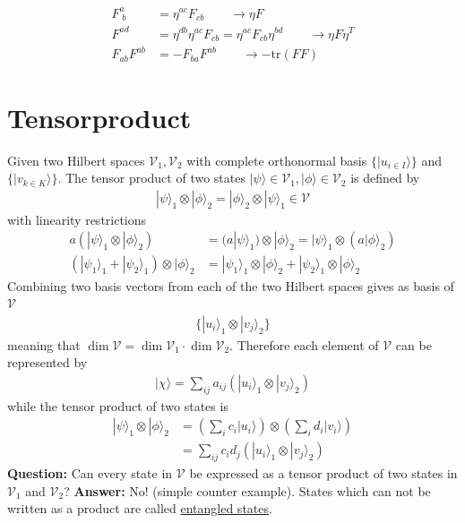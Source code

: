 \documentclass[10pt,a4paper]{book}
\theoremstyle{definition}
\begin{document}
\begin{align}
F^a_{\;b}&=\eta^{ac}F_{cb}\qquad\rightarrow \eta F\\
F^{ad}&=\eta^{db}\eta^{ac}F_{cb}=\eta^{ac}F_{cb}\eta^{bd}\qquad\rightarrow \eta F\eta^T\\
F_{ab}F^{ab}&=-F_{ba}F^{ab}\qquad\rightarrow-\text{tr}(F F)
\end{align}


\section{Tensorproduct}
Given two Hilbert spaces $\mathcal{V}_1, \mathcal{V}_2$ with complete orthonormal basis $\{|u_{i\in I}\rangle\}$ and $\{|v_{k\in K}\rangle\}$. The tensor product of two states $|\psi\rangle\in\mathcal{V}_1, |\phi\rangle\in\mathcal{V}_2$
is defined by
\begin{align}
|\psi\rangle_1 \otimes |\phi\rangle_2= |\phi\rangle_2 \otimes |\psi\rangle_1\in \mathcal{V}
\end{align}
with linearity restrictions
\begin{align}
a(|\psi\rangle_1 \otimes |\phi\rangle_2)
&=(a|\psi\rangle_1) \otimes |\phi\rangle_2
=|\psi\rangle_1 \otimes (a|\phi\rangle_2)\\
(|\psi_1\rangle_1 + |\psi_2\rangle_1)\otimes|\phi\rangle_2
&=|\psi_1\rangle_1\otimes|\phi\rangle_2 + |\psi_2\rangle_1\otimes|\phi\rangle_2
\end{align}
Combining two basis vectors from each of the two Hilbert spaces gives as basis of $\mathcal{V}$
\begin{align}
\{|u_i\rangle_1\otimes|v_j\rangle_2\}
\end{align}
meaning that $\dim \mathcal{V}=\dim \mathcal{V}_1\cdot\dim \mathcal{V}_2$.
Therefore each element of $\mathcal{V}$ can be represented by
\begin{align}
|\chi\rangle=\sum_{ij}a_{ij}(|u_i\rangle_1\otimes|v_j\rangle_2)
\end{align}
while the tensor product of two states is
\begin{align}
|\psi\rangle_1 \otimes |\phi\rangle_2
&=\left(\sum_ic_i|u_i\rangle\right)\otimes\left(\sum_id_i|v_i\rangle\right)\\
&=\sum_{ij}c_id_j(|u_i\rangle_1\otimes|v_j\rangle_2)
\end{align}
{\bf Question:} Can every state in $\mathcal{V}$ be expressed as a tensor product of two states in $\mathcal{V}_1$ and $\mathcal{V}_2$? {\bf Answer:} No!  (simple counter example). States which can not be  written as a product are called \underline{entangled  states}.
\end{document}
